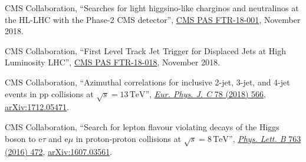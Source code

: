 \begin{description}[leftmargin=12pt,font=\normalfont\textit]
\begin{description}[leftmargin=12pt,font=\normalfont,labelsep=0em]
\item CMS Collaboration, ``Searches for light higgsino-like charginos and neutralinos at the HL-LHC with the Phase-2 CMS detector'', \href{https://cds.cern.ch/record/2648538}{CMS PAS FTR-18-001}, November 2018.
\item CMS Collaboration, ``First Level Track Jet Trigger for Displaced Jets at High Luminosity LHC'', \href{https://cds.cern.ch/record/2647987}{CMS PAS FTR-18-018}, November 2018.
\end{description}
\item[FNAL institution review leader:]
\begin{description}[leftmargin=12pt,font=\normalfont,labelsep=0em]\item[]
\item CMS Collaboration, ``Azimuthal correlations for inclusive 2-jet, 3-jet, and 4-jet events in pp collisions at $\sqrt{s} = 13\,\text{TeV}$'', \href{http://dx.doi.org/10.1140/epjc/s10052-018-6033-4}{\emph{Eur. Phys. J. C} 78 (2018) 566}, \href{http://arxiv.org/abs/1712.05471}{arXiv:1712.05471}.
\item CMS Collaboration, ``Search for lepton flavour violating decays of the Higgs boson to e$\tau$ and e$\mu$ in proton-proton collisions at $\sqrt{s} = 8\,\text{TeV}$'', \href{http://dx.doi.org/10.1016/j.physletb.2016.09.062}{\emph{Phys. Lett. B} 763 (2016) 472}, \href{http://arxiv.org/abs/1607.03561}{arXiv:1607.03561}.
\end{description}
\end{description}